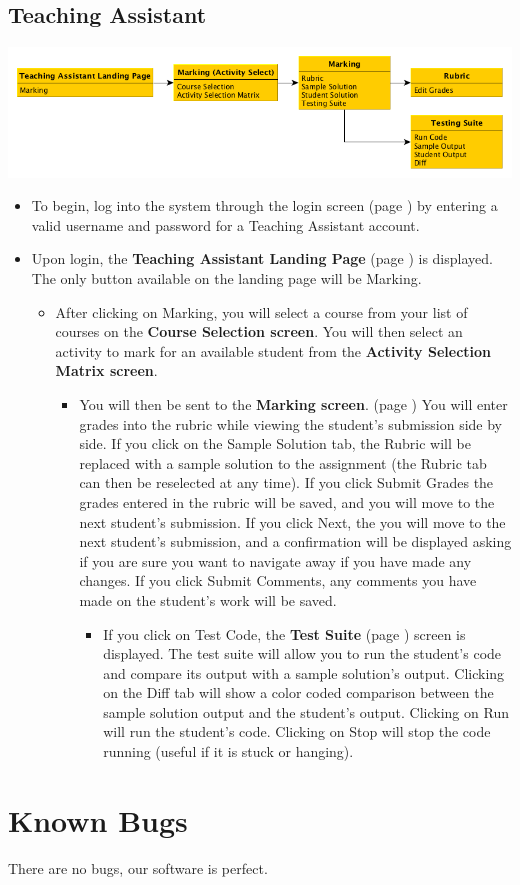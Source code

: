 \documentclass{article}
\begin{document}
\subsection{Teaching Assistant}
\centerline{\includegraphics[scale=.6]{../images/UIMockups/pngs/teachingAsst}}
\begin{itemize}
	\item To begin, log into the system through the login screen (page \pageref{login})
		by entering a valid username and password for a Teaching Assistant account.
	\item Upon login, the \textbf{Teaching Assistant Landing Page} (page \pageref{
		landPg}) is displayed. The only button available on the landing page will be 
		Marking.
	\begin{itemize}
		\item After clicking on Marking, you will select a course from your list of courses
			on the \textbf{Course Selection screen}. You will then select an activity
			to mark for an available student from the \textbf{Activity Selection Matrix
			screen}.
		\begin{itemize}
			\item You will then be sent to the \textbf{Marking screen}. (page
				\pageref{marking}) You will enter grades into the rubric while viewing 
				the student's submission side by side. If you click on the Sample Solution 
				tab, the Rubric will be replaced with a sample solution to the assignment 
				(the Rubric tab can then be reselected at any time). If you click Submit 
				Grades the grades entered in the rubric will be saved, and you will 
				move to the next student's submission. If you click Next, the you will 
				move to the next student's submission, and a confirmation will be displayed 
				asking if you are sure you want to navigate away if you have made any 
				changes. If you click Submit Comments, any comments you have made 
				on the student's work will be saved.
			\begin{itemize}
				\item If you click on Test Code, the \textbf{Test Suite} (page 
					\pageref{testSuite}) screen is displayed. The test suite will allow you 
					to run the student's code and compare its output with a sample 
					solution's output. Clicking on the Diff tab will show a color coded 
					comparison between the sample solution output and the student's 
					output. Clicking on Run will run the student's code. Clicking on Stop 
					will stop the code running (useful if it is stuck or hanging).
			\end{itemize}
		\end{itemize}
	\end{itemize}
\end{itemize}

\section{Known Bugs}
There are no bugs, our software is perfect.
\end{document}

